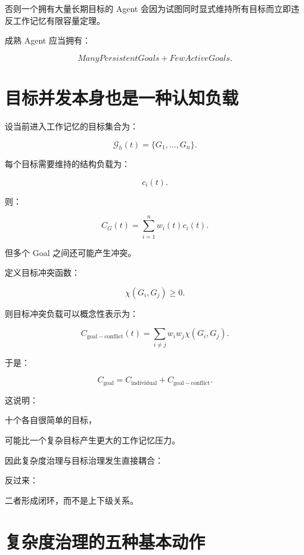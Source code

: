 否则一个拥有大量长期目标的 Agent 会因为试图同时显式维持所有目标而立即违反工作记忆有限容量定理。

成熟 Agent 应当拥有：

\[
\boxed{
ManyPersistentGoals
+
FewActiveGoals.
}
\]


\section{目标并发本身也是一种认知负载}

设当前进入工作记忆的目标集合为：

\[
\mathcal G_h(t)
=
\{G_1,\dots,G_n\}.
\]

每个目标需要维持的结构负载为：

\[
c_i(t).
\]

则：

\[
C_G(t)
=
\sum_{i=1}^{n}
w_i(t)c_i(t).
\]

但多个 Goal 之间还可能产生冲突。

定义目标冲突函数：

\[
\chi(G_i,G_j)
\geq0.
\]

则目标冲突负载可以概念性表示为：

\[
C_{\mathrm{goal-conflict}}(t)
=
\sum_{i\neq j}
w_iw_j
\chi(G_i,G_j).
\]

于是：

\[
\boxed{
C_{\mathrm{goal}}
=
C_{\mathrm{individual}}
+
C_{\mathrm{goal-conflict}}.
}
\]

这说明：

十个各自很简单的目标，

可能比一个复杂目标产生更大的工作记忆压力。

因此复杂度治理与目标治理发生直接耦合：

\begin{statementbox}
\centering
{}
\end{statementbox}

反过来：

\begin{statementbox}
\centering
{}
\end{statementbox}

二者形成闭环，而不是上下级关系。


\section{复杂度治理的五种基本动作}

